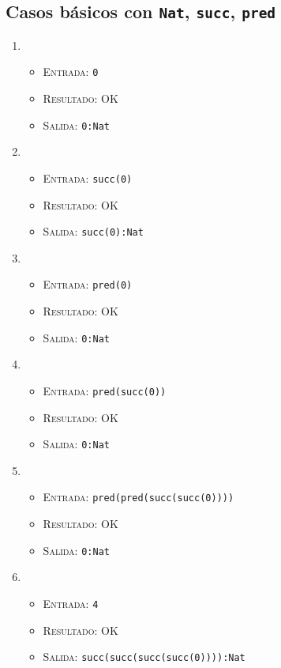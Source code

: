 \documentclass[11pt]{article}
\newcounter{savedenum}
\newcommand{\saveenum}{\setcounter{savedenum}{\theenumi}}
\begin{document}
\subsection{Casos básicos con \texttt{Nat}, \texttt{succ}, \texttt{pred}}
\begin{enumerate}
\item \begin{itemize}
    \item \textsc{Entrada:}   \verb|0|
    \item \textsc{Resultado:} OK
    \item \textsc{Salida:}    \verb|0:Nat|
    \end{itemize}
\item \begin{itemize}
    \item \textsc{Entrada:}   \verb|succ(0)|
    \item \textsc{Resultado:} OK
    \item \textsc{Salida:}    \verb|succ(0):Nat|
    \end{itemize}
\item \begin{itemize}
    \item \textsc{Entrada:}   \verb|pred(0)|
    \item \textsc{Resultado:} OK
    \item \textsc{Salida:}    \verb|0:Nat|
    \end{itemize}
\item \begin{itemize}
    \item \textsc{Entrada:}   \verb|pred(succ(0))|
    \item \textsc{Resultado:} OK
    \item \textsc{Salida:}    \verb|0:Nat|
    \end{itemize}
\item \begin{itemize}
    \item \textsc{Entrada:}   \verb|pred(pred(succ(succ(0))))|
    \item \textsc{Resultado:} OK
    \item \textsc{Salida:}    \verb|0:Nat|
    \end{itemize}
\item \begin{itemize}
    \item \textsc{Entrada:}   \verb|4|
    \item \textsc{Resultado:} OK
    \item \textsc{Salida:}    \verb|succ(succ(succ(succ(0)))):Nat| \\
    \end{itemize}
\saveenum
\end{enumerate}
\end{document}
